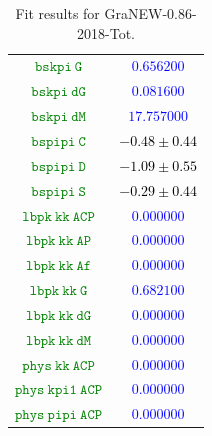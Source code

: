 \documentclass[10pt,a4paper]{article}
\begin{document}
\begin{table}[h!]
\begin{tabular}{cc}
\textcolor{Green}{$\mathtt{bskpi~G~}$} & \textcolor{blue}{$0.656200$}\\
\textcolor{Green}{$\mathtt{bskpi~dG~}$} & \textcolor{blue}{$0.081600$}\\
\textcolor{Green}{$\mathtt{bskpi~dM~}$} & \textcolor{blue}{$17.757000$}\\
\textcolor{Green}{$\mathtt{bspipi~C~}$} & \textcolor{black}{$-0.48 \pm 0.44$}\\
\textcolor{Green}{$\mathtt{bspipi~D~}$} & \textcolor{black}{$-1.09 \pm 0.55$}\\
\textcolor{Green}{$\mathtt{bspipi~S~}$} & \textcolor{black}{$-0.29 \pm 0.44$}\\
\textcolor{Green}{$\mathtt{lbpk~kk~ACP~}$} & \textcolor{blue}{$0.000000$}\\
\textcolor{Green}{$\mathtt{lbpk~kk~AP~}$} & \textcolor{blue}{$0.000000$}\\
\textcolor{Green}{$\mathtt{lbpk~kk~Af~}$} & \textcolor{blue}{$0.000000$}\\
\textcolor{Green}{$\mathtt{lbpk~kk~G~}$} & \textcolor{blue}{$0.682100$}\\
\textcolor{Green}{$\mathtt{lbpk~kk~dG~}$} & \textcolor{blue}{$0.000000$}\\
\textcolor{Green}{$\mathtt{lbpk~kk~dM~}$} & \textcolor{blue}{$0.000000$}\\
\textcolor{Green}{$\mathtt{phys~kk~ACP~}$} & \textcolor{blue}{$0.000000$}\\
\textcolor{Green}{$\mathtt{phys~kpi1~ACP~}$} & \textcolor{blue}{$0.000000$}\\
\textcolor{Green}{$\mathtt{phys~pipi~ACP~}$} & \textcolor{blue}{$0.000000$}\\
\hline
\end{tabular}
\caption{Fit results for GraNEW-0.86-2018-Tot.}
\label{tab:GraNEW_0.86_2018_Tot}
\end{table}
\end{document}
